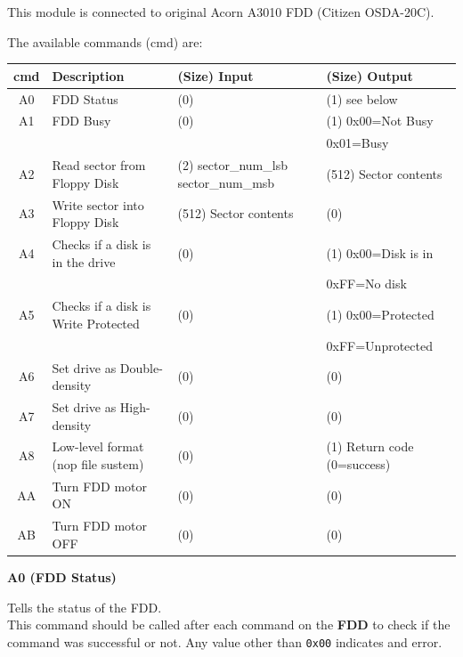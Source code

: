 \documentclass[a4paper,11pt]{article}
\begin{document}
    This module is connected to original Acorn A3010 FDD (Citizen OSDA-20C).

    The available commands (cmd) are:
 
     \begin{tabular}{| c | m{3.8cm} | m{3cm} | m{3.5cm} | }
         \hline
         \rowcolor{lightgray}
         cmd & Description & (Size) Input & (Size) Output\\
         \hline
         A0 & FDD Status & (0) & (1) see below\\
         \hline
         A1 & FDD Busy & (0) & (1) 0x00=Not Busy\\
            &          &     &     0x01=Busy\\
         \hline
         A2 & Read sector from Floppy Disk & (2) sector\_num\_lsb sector\_num\_msb & (512) Sector contents\\
         \hline
         A3 & Write sector into Floppy Disk & (512) Sector contents & (0) \\
         \hline
         A4 & Checks if a disk is in the drive & (0) & (1) 0x00=Disk is in\\
            &                                  &     &     0xFF=No disk\\
         \hline
         A5 & Checks if a disk is Write Protected & (0) & (1) 0x00=Protected\\
            &                                     &     &     0xFF=Unprotected\\
         \hline
         A6 & Set drive as Double-density & (0) & (0)\\
         \hline
         A7 & Set drive as High-density & (0) & (0)\\
         \hline
         A8 & Low-level format (nop file sustem) & (0) & (1) Return code (0=success)\\
         \hline
         AA & Turn FDD motor ON & (0) & (0)\\
         \hline
         AB & Turn FDD motor OFF & (0) & (0)\\
         \hline
     \end{tabular}

     \textbf{A0 (FDD Status)}

     Tells the status of the FDD.\\

     This command should be called after each command on the \textbf{FDD} to
     check if the command was successful or not. Any value other than
     \texttt{0x00} indicates and error.
\end{document}
